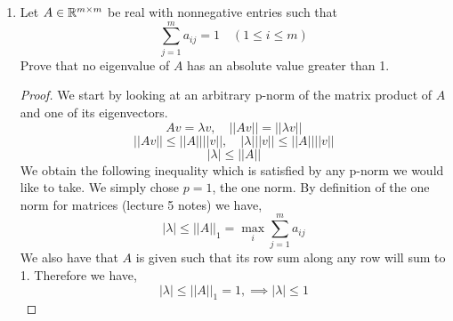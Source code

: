 \documentclass{article}
\begin{document}
\begin{enumerate}
\begin{proof}
    First, since $A$ is real and symmetric, we can decompose $A$ into an eigenvector matrix, full with orthonormal eigenvectors which form a basis for $\R^m$ and a diagonal matrix with eigenvalues of $A$ on the diagonal. Since its columns form a basis for $\R^m$ we have that we can express y as a linear combination of the eigenvectors of v: $y = c_1 v_1 + \cdots + c_m v_m$. We now define $\lambda_*$ such that, $|\lambda_*| \ge |\lambda_i|, \forall \lambda_i \in \Lambda(A), c_* \neq 0$.  
\[
    A = VDV^{-1}, \quad y = c_* v_* + c_1 v_1 + \cdots + c_m v_m
\]
\[
    A^n = VD^nV^{-1},\quad A^ny = c_*\lambda_*^n v_* + c_1\lambda_1^nv_1 + \cdots + c_m\lambda_m^nv_m
\]
\[
   A^ny = \lambda_*^n\left(c_* v_* + c_1\frac{\lambda_1^n}{\lambda_*^n} v_1 + \cdots + c_m\frac{\lambda_m^n}{\lambda_*^n}v_m\right)
\]
Note from our definition of $\lambda_*$ we either have that $|\lambda_*| \ge |\lambda_i| \bigvee \left(|\lambda_* < |\lambda_i| \bigwedge c_i = 0\right)$. Thereby, we have that 
\[
    \lim_{n\to \infty} A^ny = \lambda_*^nc_*v_*
\]
Therefore we have, 
\[
    \lim_{k \to \infty} \frac{y^TA^{k+1}y}{y^TA^ky} = \frac{\lambda_*^{k+1} c_* y^Tv_*}{\lambda_*^k c_* y^Tv_*} = \lambda_*
\]
Where $\lambda_*$ is the largest eigenvalue of $A$ which has an eigenvector as part of the expansion of $y$ into the basis of the eigenvectors of $A$. 
\end{proof}


\item %
Let $A \in \mathbb{R}^{m\times m}$ be real with nonnegative entries such that 
\[
    \sum_{j=1}^m a_{ij} = 1 \quad (1\le i \le m)
\]
Prove that no eigenvalue of $A$ has an absolute value greater than 1.

\begin{proof}
    
    We start by looking at an arbitrary p-norm of the matrix product of $A$ and one of its eigenvectors. 
    \[
        Av = \lambda v, \quad ||Av|| = ||\lambda v||
    \]       
    \[
        ||Av|| \le ||A||||v||, \quad |\lambda|||v|| \le ||A||||v||
    \]
    \[
        |\lambda| \le ||A||
    \]
    We obtain the following inequality which is satisfied by any p-norm we would like to take. We simply chose $p=1$, the one norm. By definition of the one norm for matrices (lecture 5 notes) we have, 
    \[
        |\lambda| \le ||A||_1 = \max_{i} \sum_{j=1}^m a_{ij} 
    \]
    We also have that $A$ is given such that its row sum along any row will sum to 1. Therefore we have,
    \[
        |\lambda| \le ||A||_1 = 1, \implies |\lambda| \le 1
    \]


\end{proof}
\end{enumerate}
\end{document}
